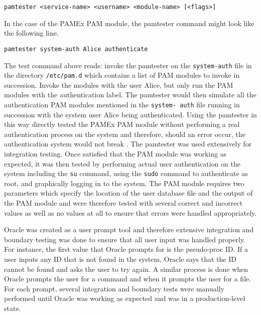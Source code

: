 \begin{verbatim}
pamtester <service-name> <username> <module-name> [<flags>] 
\end{verbatim}

In the case of the PAMEx PAM module, the pamtester command might look 
like the following line. 

\begin{verbatim}
pamtester system-auth Alice authenticate
\end{verbatim}

The test command above reads: invoke the pamtester on the \texttt{system-auth} 
file in the directory \texttt{/etc/pam.d} which contains a list of PAM modules 
to invoke in succession. Invoke the modules with the user Alice, but 
only run the PAM modules with the authentication label. The pamtester 
would then simulate all the authentication PAM modules mentioned in the 
\texttt{system- auth} file running in succession with the system user Alice being 
authenticated. Using the pamtester in this way 
directly tested the PAMEx PAM module without performing a real 
authentication process on the system and therefore, should an error 
occur, the authentication system would not break \cite{man7pam}. The pamtester was 
used extensively for integration testing. Once satisfied 
that the PAM module was working as expected, it was then tested by 
performing actual user authentication on the system including the \texttt{su} 
command, using the \texttt{sudo} command to authenticate as root, and 
graphically logging in to the system. The PAM module requires two 
parameters which specify the location of the user database file and 
the output of the PAM module and were therefore tested with several 
correct and incorrect values as well as no values at all to ensure that 
errors were handled appropriately. 

Oracle was created as a user prompt tool and therefore extensive 
integration and boundary testing was done to ensure that all user input 
was handled properly. For instance, the first value that Oracle prompts 
for is the pseudo-proc ID. If a user inputs any ID that is not found in 
the system, Oracle says that the ID cannot be found and asks the user 
to try again. A similar process is done when Oracle prompts the user 
for a command and when it prompts the user for a file. For each prompt, 
several integration and boundary tests were manually performed
until Oracle was working as expected and was in a 
production-level state. 

